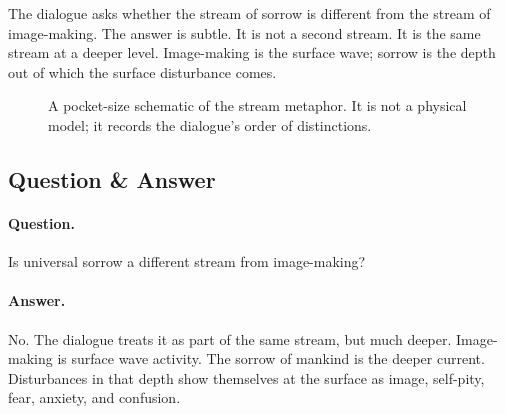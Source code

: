 The dialogue asks whether the stream of sorrow is different from the stream of image-making. The answer is subtle. It is not a second stream. It is the same stream at a deeper level. Image-making is the surface wave; sorrow is the depth out of which the surface disturbance comes.

\begin{figure}
\centering
{}
\caption{A pocket-size schematic of the stream metaphor. It is not a physical model; it records the dialogue's order of distinctions.}
\end{figure}

\subsection{Question \& Answer}

\paragraph{Question.}
Is universal sorrow a different stream from image-making?

\paragraph{Answer.}
No. The dialogue treats it as part of the same stream, but much deeper. Image-making is surface wave activity. The sorrow of mankind is the deeper current. Disturbances in that depth show themselves at the surface as image, self-pity, fear, anxiety, and confusion.


